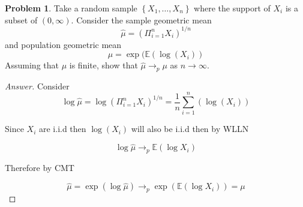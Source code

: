 \documentclass{article}
\theoremstyle{definition}
\newtheorem{problem}{Problem}
\begin{document}
\begin{problem}
Take a random sample $\left\{X_{1}, \ldots, X_{n}\right\}$ where the support of $X_{i}$ is a subset of $(0, \infty) .$ Consider
the sample geometric mean
$$
\widehat{\mu}=\left(\Pi_{i=1}^{n} X_{i}\right)^{1 / n}
$$
and population geometric mean
$$
\mu=\exp (\mathbb{E}(\log (X_i))
$$
Assuming that $\mu$ is finite, show that $\widehat{\mu} \rightarrow_{p} \mu$ as $n \rightarrow \infty$.
\end{problem}

\begin{proof}[Answer]
Consider
$$\log \widehat{\mu} = \log\left(\Pi_{i=1}^{n} X_{i}\right)^{1 / n}  = \frac{1}{n}\sum_{i=1}^n (\log(X_i))$$

Since $X_i$ are i.i.d then $\log(X_i)$ will also be i.i.d then by WLLN

$$\log \widehat{\mu} \to_p \mathbb{E}(\log X_i)$$

Therefore by CMT

$$\widehat{\mu} = \exp(\log \widehat{\mu}) \to_p \exp(\mathbb{E}(\log X_i))=\mu$$

\end{proof}
\end{document}
